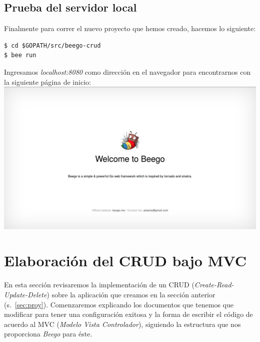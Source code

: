 \documentclass[12pt]{article}
\begin{document}
\subsection{Prueba del servidor local}\label{sec:pr}
\noindent Finalmente para correr el nuevo proyecto que hemos creado, hacemos lo siguiente:
\begin{verbatim}
$ cd $GOPATH/src/beego-crud
$ bee run
\end{verbatim}
\noindent Ingresamos \textit{localhost:8080} como dirección en el navegador para encontrarnos con la siguiente página de inicio: \\

\includegraphics[scale=0.25]{beego.png}
\newpage

\section{Elaboración del CRUD bajo MVC}
En esta sección revisaremos la implementación de un CRUD (\textit{Create-Read-Update-Delete}) sobre la aplicación que creamos en la sección anterior (s.~\ref{sec:proy}). Comenzaremos explicando los documentos que tenemos que modificar para tener una configuración exitosa y la forma de escribir el código de acuerdo al MVC (\textit{Modelo Vista Controlador}), siguiendo la estructura que nos proporciona \textit{Beego} para éste.
\end{document}
